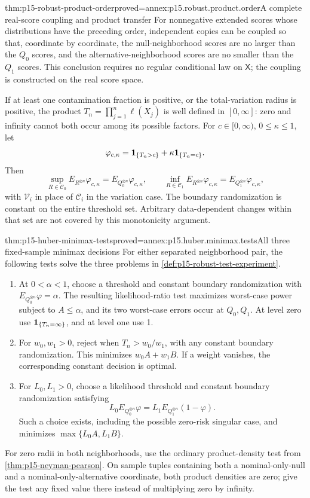 \begin{hblemma}{thm:p15-robust-product-order}{proved=annex:p15.robust.product.order}{A complete real-score coupling and product transfer}
For nonnegative extended scores whose distributions have the preceding
order, independent copies can be coupled so that, coordinate by coordinate,
the null-neighborhood scores are no larger than the \(Q_0\) scores,
and the alternative-neighborhood scores are no smaller than the \(Q_1\)
scores. This conclusion requires no regular conditional law on
\(\mathsf X\); the coupling is constructed on the real score space.

If at least one contamination fraction is positive, or the total-variation
radius is positive, the product \(T_n=\prod_{j=1}^n\ell(X_j)\) is
well defined in \([0,\infty]\): zero and infinity cannot both occur
among its possible factors. For \(c\in[0,\infty)\), \(0\leq\kappa\leq1\),
let
\[
 \varphi_{c,\kappa}
   ={\bf1}_{\{T_n>c\}}+\kappa{\bf1}_{\{T_n=c\}} .
\]
Then
\[
 \sup_{R\in\mathcal C_0}E_{R^{\otimes n}}\varphi_{c,\kappa}
       =E_{Q_0^{\otimes n}}\varphi_{c,\kappa},\qquad
 \inf_{R\in\mathcal C_1}E_{R^{\otimes n}}\varphi_{c,\kappa}
       =E_{Q_1^{\otimes n}}\varphi_{c,\kappa},
\]
with \(\mathcal V_i\) in place of \(\mathcal C_i\) in the variation case.
The boundary randomization is constant on the entire threshold set.
Arbitrary data-dependent changes within that set are not covered by
this monotonicity argument.
\end{hblemma}

\begin{hbtheorem}{thm:p15-huber-minimax-tests}{proved=annex:p15.huber.minimax.tests}{All three fixed-sample minimax decisions}
For either separated neighborhood pair, the following tests solve the
three problems in \cref{def:p15-robust-test-experiment}.
\begin{enumerate}
\item At \(0<\alpha<1\), choose a threshold and constant boundary
randomization with \(E_{Q_0^{\otimes n}}\varphi=\alpha\).
The resulting likelihood-ratio test maximizes worst-case power subject
to \(A\leq\alpha\), and its two worst-case errors occur at \(Q_0,Q_1\).
At level zero use \({\bf1}_{\{T_n=\infty\}}\), and at level one use 1.
\item For \(w_0,w_1>0\), reject when \(T_n>w_0/w_1\), with any constant
boundary randomization. This minimizes \(w_0A+w_1B\). If a weight
vanishes, the corresponding constant decision is optimal.
\item For \(L_0,L_1>0\), choose a likelihood threshold and constant
boundary randomization satisfying
\[
 L_0E_{Q_0^{\otimes n}}\varphi
       =L_1E_{Q_1^{\otimes n}}(1-\varphi).
\]
Such a choice exists, including the possible zero-risk singular case,
and minimizes \(\max\{L_0A,L_1B\}\).
\end{enumerate}
For zero radii in both neighborhoods, use the ordinary product-density
test from \cref{thm:p15-neyman-pearson}. On sample tuples containing
both a nominal-only-null and a nominal-only-alternative coordinate,
both product densities are zero; give the test any fixed value there
instead of multiplying zero by infinity.
\end{hbtheorem}

